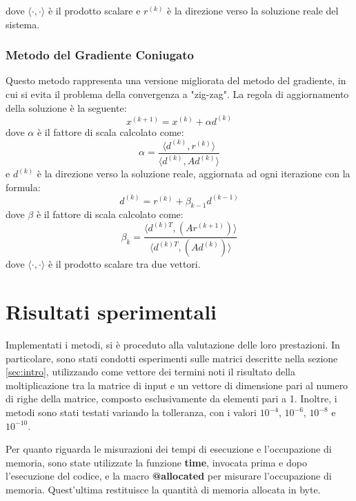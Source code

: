 dove $\langle \cdot, \cdot \rangle$ è il prodotto scalare e $r^{(k)}$ è la direzione
verso la soluzione reale del sistema.

\subsubsection{Metodo del Gradiente Coniugato}
Questo metodo rappresenta una versione migliorata del metodo del gradiente, in
cui si evita il problema della convergenza a "zig-zag". La regola di aggiornamento
della soluzione è la seguente:
\begin{equation}
    x^{(k+1)} = x^{(k)} + \alpha d^{(k)}
\end{equation}
dove $\alpha$ è il fattore di scala calcolato come:
\begin{equation}
    \alpha = \frac{\langle d^{(k)}, r^{(k)}\rangle}{\langle d^{(k)}, Ad^{(k)}\rangle}
\end{equation}
e $d^{(k)}$ è la direzione verso la soluzione reale, aggiornata ad ogni iterazione
con la formula:
\begin{equation}
    d^{(k)} = r^{(k)} + \beta_{k-1} d^{(k-1)}
\end{equation}
dove $\beta$ è il fattore di scala calcolato come:
\begin{equation}
    \beta_k = \frac{\langle d^{(k)T}, (Ar^{(k + 1)})\rangle}{\langle d^{(k)T}, (Ad^{(k)})\rangle}
\end{equation}
dove $\langle \cdot, \cdot \rangle$ è il prodotto scalare tra due vettori.

\section{Risultati sperimentali}
Implementati i metodi, si è proceduto alla valutazione delle loro prestazioni.
In particolare, sono stati condotti esperimenti sulle matrici descritte nella
sezione \ref{sec:intro}, utilizzando come vettore dei termini noti il risultato
della moltiplicazione tra la matrice di input e un vettore di dimensione pari al
numero di righe della matrice, composto esclusivamente da elementi pari a 1.
Inoltre, i metodi sono stati testati variando la tolleranza, con i valori $10^{-4}$,
$10^{-6}$, $10^{-8}$ e $10^{-10}$.

Per quanto riguarda le misurazioni dei tempi di esecuzione e l'occupazione di
memoria, sono state utilizzate la funzione \textbf{time}, invocata prima e dopo
l'esecuzione del codice, e la macro \textbf{@allocated} per misurare l'occupazione
di memoria. Quest'ultima restituisce la quantità di memoria allocata in byte.

